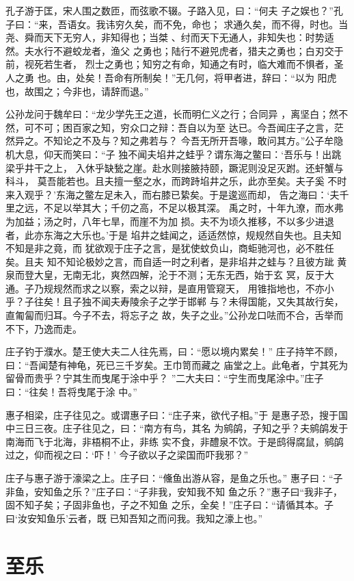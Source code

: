 \documentclass[a4paper,12pt,UTF8,twoside]{ctexbook}
\begin{document}
孔子游于匡，宋人围之数匝，而弦歌不辍。子路入见，曰：“何夫 子之娱也？”孔子曰：“来，吾语女。我讳穷久矣，而不免，命也； 求通久矣，而不得，时也。当尧、舜而天下无穷人，非知得也；当桀 、纣而天下无通人，非知失也：时势适然。夫水行不避蛟龙者，渔父 之勇也；陆行不避兕虎者，猎夫之勇也；白刃交于前，视死若生者， 烈士之勇也；知穷之有命，知通之有时，临大难而不惧者，圣人之勇 也。由，处矣！吾命有所制矣！”无几何，将甲者进，辞曰：“以为 阳虎也，故围之；今非也，请辞而退。”

公孙龙问于魏牟曰：“龙少学先王之道，长而明仁义之行；合同异 ，离坚白；然不然，可不可；困百家之知，穷众口之辩：吾自以为至 达已。今吾闻庄子之言，茫然异之。不知论之不及与？知之弗若与？ 今吾无所开吾喙，敢问其方。”公子牟隐机大息，仰天而笑曰：“子 独不闻夫埳井之蛙乎？谓东海之鳖曰：‘吾乐与！出跳梁乎井干之上， 入休乎缺甃之崖。赴水则接腋持颐，蹶泥则没足灭跗。还虷蟹与科斗， 莫吾能若也。且夫擅一壑之水，而跨跱埳井之乐，此亦至矣。夫子奚 不时来入观乎？’东海之鳖左足未入，而右膝已絷矣。于是逡巡而却， 告之海曰：‘夫千里之远，不足以举其大；千仞之高，不足以极其深。 禹之时，十年九潦，而水弗为加益；汤之时，八年七旱，而崖不为加 损。夫不为顷久推移，不以多少进退者，此亦东海之大乐也。’于是 埳井之蛙闻之，适适然惊，规规然自失也。且夫知不知是非之竟，而 犹欲观于庄子之言，是犹使蚊负山，商蚷驰河也，必不胜任矣。且夫 知不知论极妙之言，而自适一时之利者，是非埳井之蛙与？且彼方跐 黄泉而登大皇，无南无北，爽然四解，沦于不测；无东无西，始于玄 冥，反于大通。子乃规规然而求之以察，索之以辩，是直用管窥天， 用锥指地也，不亦小乎？子往矣！且子独不闻夫寿陵余子之学于邯郸 与？未得国能，又失其故行矣，直匍匐而归耳。今子不去，将忘子之 故，失子之业。”公孙龙口呿而不合，舌举而不下，乃逸而走。

庄子钓于濮水。楚王使大夫二人往先焉，曰：“愿以境内累矣！” 庄子持竿不顾，曰：“吾闻楚有神龟，死已三千岁矣。王巾笥而藏之 庙堂之上。此龟者，宁其死为留骨而贵乎？宁其生而曳尾于涂中乎？ ”二大夫曰：“宁生而曳尾涂中。”庄子曰：“往矣！吾将曳尾于涂 中。”

惠子相梁，庄子往见之。或谓惠子曰：“庄子来，欲代子相。”于 是惠子恐，搜于国中三日三夜。庄子往见之，曰：“南方有鸟，其名 为鹓鹐，子知之乎？夫鹓鹐发于南海而飞于北海，非梧桐不止，非练 实不食，非醴泉不饮。于是鸱得腐鼠，鹓鹐过之，仰而视之曰：‘吓！’ 今子欲以子之梁国而吓我邪？”

庄子与惠子游于濠梁之上。庄子曰：“儵鱼出游从容，是鱼之乐也。” 惠子曰∶“子非鱼，安知鱼之乐？”庄子曰：“子非我，安知我不知 鱼之乐？”惠子曰“我非子，固不知子矣；子固非鱼也，子之不知鱼 之乐，全矣！”庄子曰：“请循其本。子曰‘汝安知鱼乐’云者，既 已知吾知之而问我。我知之濠上也。”
\section{至乐}
\end{document}
